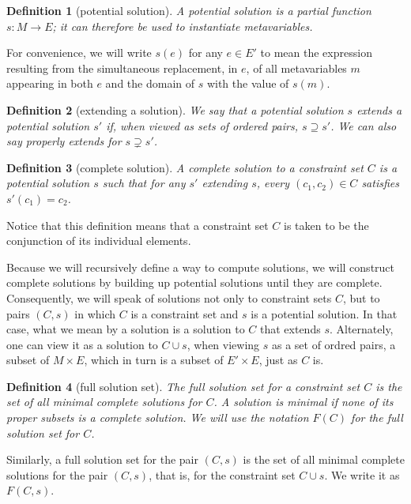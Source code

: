 \documentclass{article}
\newtheorem{dfn}{Definition}
\begin{document}
\begin{dfn}[potential solution]
A \emph{potential solution} is a partial function $s:M\to E$; it can therefore be used to instantiate metavariables.
\end{dfn}

For convenience, we will write $s(e)$ for any $e\in E'$ to mean the expression resulting from the simultaneous replacement, in $e$, of all metavariables $m$ appearing in both $e$ and the domain of $s$ with the value of $s(m)$.

\begin{dfn}[extending a solution]
We say that a potential solution $s$ \emph{extends} a potential solution $s'$ if, when viewed as sets of ordered pairs, $s\supseteq s'$.  We can also say \emph{properly extends} for $s\supsetneq s'$.
\end{dfn}

\begin{dfn}[complete solution]\label{D:sol}
A \emph{complete solution} to a constraint set $C$ is a potential solution $s$ such that for any $s'$ extending $s$, every $(c_1,c_2)\in C$ satisfies $s'(c_1)=c_2$.
\end{dfn}

Notice that this definition means that a constraint set $C$ is taken to be the conjunction of its individual elements.

Because we will recursively define a way to compute solutions, we will construct complete solutions by building up potential solutions until they are complete.  Consequently, we will speak of solutions not only to constraint sets $C$, but to pairs $(C,s)$ in which $C$ is a constraint set and $s$ is a potential solution.  In that case, what we mean by a solution is a solution to $C$ that extends $s$.  Alternately, one can view it as a solution to $C\cup s$, when viewing $s$ as a set of ordred pairs, a subset of $M\times E$, which in turn is a subset of $E'\times E$, just as $C$ is.

\begin{dfn}[full solution set]\label{D:F}
The \emph{full solution set} for a constraint set $C$ is the set of all minimal complete solutions for $C$.  A solution is minimal if none of its proper subsets is a complete solution.  We will use the notation $F(C)$ for the full solution set for $C$.
\end{dfn}

Similarly, a full solution set for the pair $(C,s)$ is the set of all minimal complete solutions for the pair $(C,s)$, that is, for the constraint set $C\cup s$.  We write it as $F(C,s)$.
\end{document}

